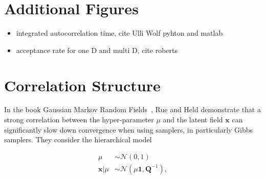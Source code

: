 \chapter{Additional Figures}
\label{ap:addFig}

\begin{itemize}
	\item integrated autocorrelation time, cite Ulli Wolf \cite{UwerrM} pyhton and matlab
	\item acceptance rate for one D and multi D, cite roberts
\end{itemize}

\chapter{Correlation Structure}
\label{ap:Correlatation}
In the book Gaussian Markov Random Fields~\cite{rue2005gaussian}, Rue and Held demonstrate that a strong correlation between the hyper-parameter $\mu$ and the latent field $\bm{x}$ can significantly slow down convergence when using samplers, in particularly Gibbs samplers. 
They consider the hierarchical model

\begin{subequations}
\begin{align}
\mu &\sim \mathcal{N}(0, 1) \\
\bm{x} | \mu &\sim \mathcal{N}(\mu \bm{1}, \bm{Q}^{-1}),
\end{align}
\label{eq:rueMod}
\end{subequations}

